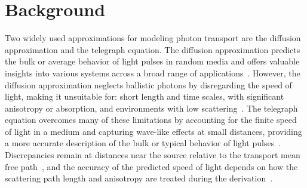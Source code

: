
\section{Background}

Two widely used approximations for modeling photon transport are the diffusion approximation and the telegraph equation. The diffusion approximation predicts the bulk or average behavior of light pulses in random media and offers valuable insights into various systems across a broad range of applications~\cite{haskell_boundary_1994, chandrasekhar_radiative_1950,  brown_light_1975, chandrasekhar_stochastic_1943, allgaier_diffuse_2021, taitelbaum_diagnosis_1999, amendola_accuracy_2021}. However, the diffusion approximation neglects ballistic photons by disregarding the speed of light, making it unsuitable for: short length and time scales,  with significant anisotropy or absorption, and environments with low scattering~\cite{ishimaru_wave_1997, yoo_time-resolved_1990, yoo_when_1990, durian_photon_1997, zhang_wave_2002, pierrat_photon_2006}. The telegraph equation overcomes many of these limitations by accounting for the finite speed of light in a medium and capturing wave-like effects at small distances, providing a more accurate description of the bulk or typical behavior of light pulses~\cite{goldstein_diffusion_1951, durian_two-stream_1996, durian_photon_1997, lemieux_diffusing-light_1998, masoliver_solutions_1992, masoliver_finite-velocity_1996, das_non-fickian_1998, polishchuk_photon-density_1997}. Discrepancies remain at distances near the source relative to the transport mean free path~\cite{durian_photon_1997, dudko_photon_2005, lemieux_diffusing-light_1998}, and the accuracy of the predicted speed of light depends on how the scattering path length and anisotropy are treated during the derivation~\cite{ heizler_asymptotic_2012, hoenders_telegraphers_2005, polishchuk_photon-density_1997}.

